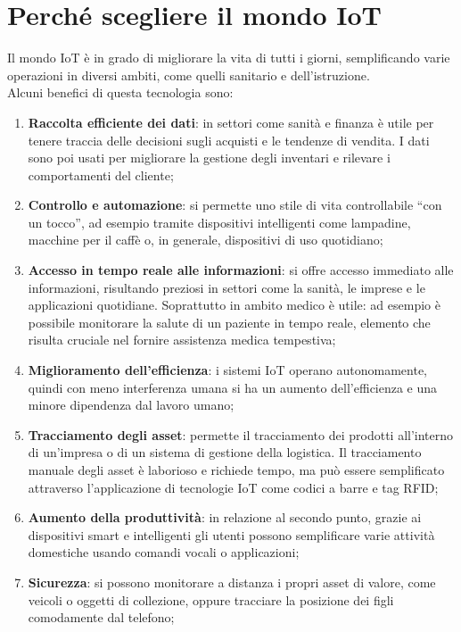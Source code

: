 \section{Perché scegliere il mondo IoT}

Il mondo IoT è in grado di migliorare la vita di tutti i giorni, semplificando varie operazioni in diversi ambiti, come quelli sanitario e dell'istruzione. \\

\noindent Alcuni benefici di questa tecnologia sono\cite{iot-vantaggi}:
\begin{enumerate}
    \item \textbf{Raccolta efficiente dei dati}: in settori come sanità e finanza è utile per tenere traccia delle decisioni sugli acquisti e le tendenze di vendita. I dati sono poi usati per migliorare la gestione degli inventari e rilevare i comportamenti del cliente;
    \item \textbf{Controllo e automazione}: si permette uno stile di vita controllabile ``con un tocco'', ad esempio tramite dispositivi intelligenti come lampadine, macchine per il caffè o, in generale, dispositivi di uso quotidiano;
    \item \textbf{Accesso in tempo reale alle informazioni}: si offre accesso immediato alle informazioni, risultando preziosi in settori come la sanità, le imprese e le applicazioni quotidiane. Soprattutto in ambito medico è utile: ad esempio è possibile monitorare la salute di un paziente in tempo reale, elemento che risulta cruciale nel fornire assistenza medica tempestiva;
    \item \textbf{Miglioramento dell'efficienza}: i sistemi IoT operano autonomamente, quindi con meno interferenza umana si ha un aumento dell'efficienza e una minore dipendenza dal lavoro umano;
    \item \textbf{Tracciamento degli asset}: permette il tracciamento dei prodotti all'interno di un'impresa o di un sistema di gestione della logistica. Il tracciamento manuale degli asset è laborioso e richiede tempo, ma può essere semplificato attraverso l'applicazione di tecnologie IoT come codici a barre e tag RFID;
    \item \textbf{Aumento della produttività}: in relazione al secondo punto, grazie ai dispositivi smart e intelligenti gli utenti possono semplificare varie attività domestiche usando comandi vocali o applicazioni;
    \item \textbf{Sicurezza}: si possono monitorare a distanza i propri asset di valore, come veicoli o oggetti di collezione, oppure tracciare la posizione dei figli comodamente dal telefono;

\end{enumerate}
